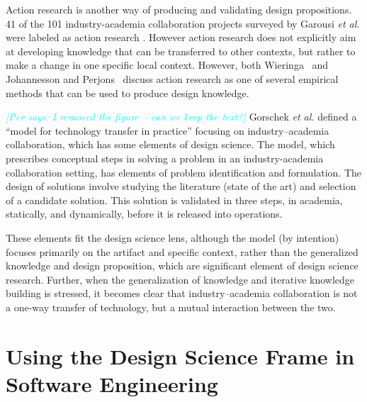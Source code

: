 \documentclass[graybox]{svmult}
\newcommand{\per}[1]{\textcolor{cyan}{{\it [Per says: #1]}}}
\newcommand{\per}[1]{}
\begin{document}
Action research is another way of producing and validating design propositions.  41 of the 101 industry-academia collaboration projects surveyed by Garousi \emph{et al.} were labeled as action research \cite{Garousi2019}. However action research does not explicitly aim at developing knowledge that can be transferred to other contexts, but rather to make a change in one specific local context. However, both Wieringa~\cite{wieringa_technical_2012} and Johannesson and Perjons~\cite{johannesson_introduction_2014} discuss action research as one of several empirical methods that can be used to produce design knowledge.



\per{I removed the figure -- can we keep the text?}
Gorschek \emph{et al.} defined a ``model for technology transfer in practice'' \cite{GorschekSW2006} focusing on industry--academia collaboration, which has some elements of design science. %
The model, which prescribes conceptual steps in solving a problem in an industry-academia collaboration setting, has elements of problem identification and formulation. The design of solutions involve studying the literature (state of the art) and selection of a candidate solution. This solution is validated in three steps, in academia, statically, and dynamically, before it is released into operations. 

These elements fit the design science lens, although the model (by intention) focuses primarily on the artifact and specific context, rather than the generalized knowledge and design proposition, which are significant element of design science research. Further, when the generalization of knowledge and iterative knowledge building is stressed, it becomes clear that industry--academia collaboration is not a one-way transfer of technology, but a mutual interaction between the two.


\section{Using the Design Science Frame in Software Engineering}
\label{sec:UsingDSinSE}
\end{document}
